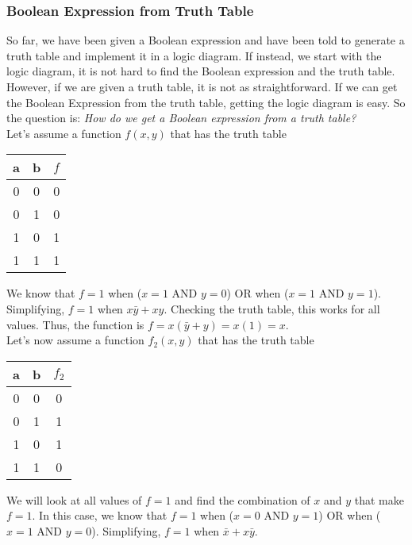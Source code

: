 \documentclass[]{article}
\begin{document}
\subsubsection{Boolean Expression from Truth Table}

So far, we have been given a Boolean expression and have been told to generate a truth table and implement it in a logic diagram. If instead, we start with the logic diagram, it is not hard to find the Boolean expression and the truth table. However, if we are given a truth table, it is not as straightforward. If we can get the Boolean Expression from the truth table, getting the logic diagram is easy. So the question is: \textit{How do we get a Boolean expression from a truth table?}\\

Let's assume a function $f(x, y)$ that has the truth table

\begin{center}
	\begin{tabular}{|c|c||c|}
		a & b & $f$ \\\hline
		0 & 0 & 0 \\
		0 & 1 & 0 \\
		1 & 0 & 1 \\
		1 & 1 & 1 \\
	\end{tabular}
	\bigbreak
\end{center}

We know that $f=1$ when ($x=1$ AND $y=0$) OR when ($x=1$ AND $y=1$). Simplifying, $f=1$ when $x\bar{y} + xy$. Checking the truth table, this works for all values. Thus, the function is $f = x(\bar{y} + y) = x(1) = x$.\\

Let's now assume a function $f_2(x, y)$ that has the truth table

\begin{center}
	\begin{tabular}{|c|c||c|}
		a & b & $f_2$ \\\hline
		0 & 0 & 0 \\
		0 & 1 & 1 \\
		1 & 0 & 1 \\
		1 & 1 & 0 \\
	\end{tabular}
	\bigbreak
\end{center}

We will look at all values of $f=1$ and find the combination of $x$ and $y$ that make $f=1$. In this case, we know that $f=1$ when ($x=0$ AND $y=1$) OR when ($x=1$ AND $y=0$). Simplifying, $f=1$ when $\bar{x} + x\bar{y}$.\\
\end{document}
